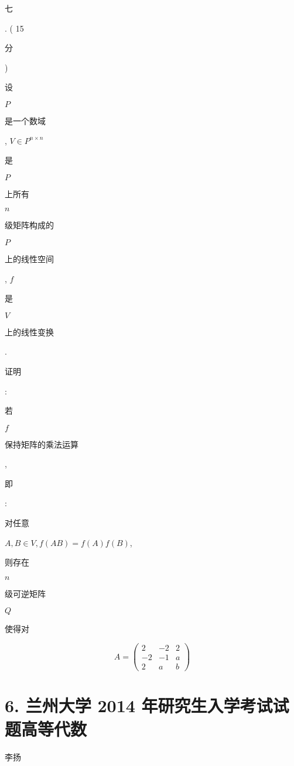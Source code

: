 \documentclass[10pt]{article}
\begin{document}
\begin{CJK}{UTF8}{mj}七\end{CJK}. ( 15 \begin{CJK}{UTF8}{mj}分\end{CJK}) \begin{CJK}{UTF8}{mj}设\end{CJK} $P$ \begin{CJK}{UTF8}{mj}是一个数域\end{CJK}, $V \in P^{n \times n}$ \begin{CJK}{UTF8}{mj}是\end{CJK} $P$ \begin{CJK}{UTF8}{mj}上所有\end{CJK} $n$ \begin{CJK}{UTF8}{mj}级矩阵构成的\end{CJK} $P$ \begin{CJK}{UTF8}{mj}上的线性空间\end{CJK}, $f$ \begin{CJK}{UTF8}{mj}是\end{CJK} $V$ \begin{CJK}{UTF8}{mj}上的线性变换\end{CJK}. \begin{CJK}{UTF8}{mj}证明\end{CJK}: \begin{CJK}{UTF8}{mj}若\end{CJK} $f$ \begin{CJK}{UTF8}{mj}保持矩阵的乘法运算\end{CJK}, \begin{CJK}{UTF8}{mj}即\end{CJK}: \begin{CJK}{UTF8}{mj}对任意\end{CJK} $A, B \in V, f(A B)=f(A) f(B)$, \begin{CJK}{UTF8}{mj}则存在\end{CJK} $n$ \begin{CJK}{UTF8}{mj}级可逆矩阵\end{CJK} $Q$ \begin{CJK}{UTF8}{mj}使得对\end{CJK}
$$
A=\left(\begin{array}{ccc}
2 & -2 & 2 \\
-2 & -1 & a \\
2 & a & b
\end{array}\right)
$$

\section{6. 兰州大学 2014 年研究生入学考试试题高等代数}
\begin{CJK}{UTF8}{mj}李扬\end{CJK}
\end{document}
